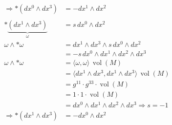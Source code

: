 \begin{align*}
	\Rightarrow \ast(dx^0 \wedge dx^3)
	&=
	-dx^1 \wedge dx^2
\\
\\
	\ast \underbrace{(dx^1 \wedge dx^3)}_{\omega}
	&=
	s \, dx^0 \wedge dx^2
	\\
	\omega \wedge \ast \omega
	&=
	dx^1 \wedge dx^3 \wedge s \, dx^0 \wedge dx^2
	\\
	&=
	-s \, dx^0 \wedge dx^1 \wedge dx^2 \wedge dx^3
	\\
	\omega \wedge \ast \omega
	&=
	\langle \omega, \omega \rangle \, \operatorname{vol}(M)
	\\
	&=
	\langle dx^1 \wedge dx^3, dx^1 \wedge dx^3 \rangle \, \operatorname{vol}(M)
	\\
	&=
	g^{11} \cdot g^{33} \cdot \operatorname{vol}(M)
	\\
	&=
	1 \cdot 1 \cdot \operatorname{vol}(M)
	\\
	&=
	dx^0 \wedge dx^1 \wedge dx^2 \wedge dx^3 \Rightarrow s = -1
	\\
	\Rightarrow \ast(dx^1 \wedge dx^3)
	&=
	-dx^0 \wedge dx^2
\end{align*}
